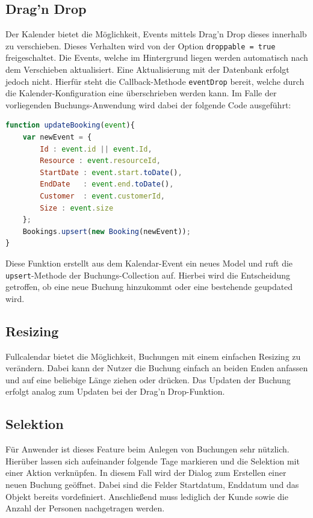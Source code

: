 \subsection{Drag'n Drop}
Der Kalender bietet die Möglichkeit, Events mittels Drag'n Drop dieses innerhalb zu verschieben. Dieses Verhalten wird von der Option \texttt{droppable = true} freigeschaltet. Die Events, welche im Hintergrund liegen werden automatisch nach dem Verschieben aktualisiert. Eine Aktualisierung mit der Datenbank erfolgt jedoch nicht. Hierfür steht die Callback-Methode \texttt{eventDrop} bereit, welche durch die Kalender-Konfiguration eine überschrieben werden kann. Im Falle der vorliegenden Buchungs-Anwendung wird dabei der folgende Code ausgeführt:

 \begin{lstlisting}[language=Javascript, label=code_exampleUpdateBooking, caption=Aktualisierungscode nach einem Drag n Drop-Event]
function updateBooking(event){
    var newEvent = {
        Id : event.id || event.Id,
        Resource : event.resourceId,
        StartDate : event.start.toDate(),
        EndDate   : event.end.toDate(),
        Customer  : event.customerId,
        Size : event.size
    };
    Bookings.upsert(new Booking(newEvent));
}
 \end{lstlisting}

 Diese Funktion erstellt aus dem Kalendar-Event ein neues Model und ruft die \texttt{upsert}-Methode der Buchungs-Collection auf. Hierbei wird die Entscheidung getroffen, ob eine neue Buchung hinzukommt oder eine bestehende geupdated wird.

 \subsection{Resizing}
 Fullcalendar bietet die Möglichkeit, Buchungen mit einem einfachen Resizing zu verändern. Dabei kann der Nutzer die Buchung einfach an beiden Enden anfassen und auf eine beliebige Länge ziehen oder drücken. Das Updaten der Buchung erfolgt analog zum Updaten bei der Drag'n Drop-Funktion.

\subsection{Selektion}
Für Anwender ist dieses Feature beim Anlegen von Buchungen sehr nützlich. Hierüber lassen sich aufeinander folgende Tage markieren und die Selektion mit einer Aktion verknüpfen. In diesem Fall wird der Dialog zum Erstellen einer neuen Buchung geöffnet. Dabei sind die Felder Startdatum, Enddatum und das Objekt bereits vordefiniert. Anschließend muss lediglich der Kunde sowie die Anzahl der Personen nachgetragen werden.